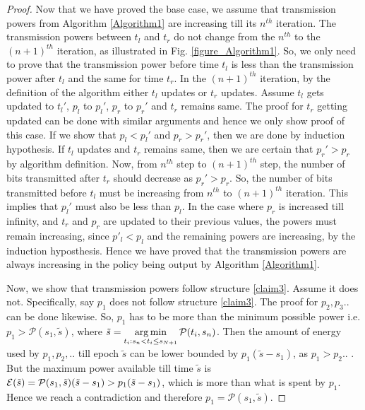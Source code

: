 \begin{proof}
Now that we have proved the base case, we assume that transmission powers from Algorithm \ref{Algorithm1} are increasing till its $n^{th}$ iteration. The transmission powers between $t_l$ and $t_r$ do not change from the $n^{th}$ to the $(n+1)^{th}$ iteration, as illustrated in Fig. \ref{figure_Algorithm1}. So, we only need to prove that the transmission power before time $t_l$ is less than the transmission power after $t_l$ and the same for time $t_r$. In the $(n+1)^{th}$ iteration, by the definition of the algorithm either $t_l$ updates or $t_{r}$ updates. Assume $t_l$ gets updated to $t_{l}'$, $p_l$ to $p_l'$, $p_r$ to $p_r'$ and $t_r$ remains same. The proof for $t_r$ getting updated can be done with similar arguments and hence we only show proof of this case. If we show that $p_l<p_l'$ and $p_r>p_r'$, then we are done by induction hypothesis. If $t_l$ updates and $t_r$ remains same, then we are certain that $p_{r}'>p_r$ by algorithm definition. Now, from $n^{th}$ step to $(n+1)^{th}$ step, the number of bits transmitted after $t_r$ should decrease as $p_{r}'>p_r$. So, the number of bits transmitted before $t_l$ must be increasing from $n^{th}$ to $(n+1)^{th}$ iteration. This implies that $p_l'$ must also be less than $p_l$. In the case where $p_r$ is increased till infinity, and $t_r$ and $p_r$ are updated to their previous values, the powers must remain increasing, since $p'_l <p_l$ and the remaining powers are increasing, by the induction hyposthesis. Hence we have proved that the transmission powers are always increasing in the policy being output by Algorithm \ref{Algorithm1}.

Now, we show that transmission powers follow structure \eqref{claim3}. Assume it does not. Specifically, say $p_1$ does not follow structure \eqref{claim3}. The proof for $p_2,p_3..$ can be done likewise. So, $p_1$ has to be more than the minimum possible power i.e. $p_1>\mathcal{P}(s_1,\tilde{s})$, where $\tilde{s}=\displaystyle\operatorname*{arg\,min}_{t_i: s_n < t_i \le s_{N+1}} \mathcal{P}(t_i,s_n)$. Then the amount of energy used by $p_1,p_2,..$ till epoch $\tilde{s}$ can be lower bounded by $p_1(\tilde{s}-s_1)$, as $p_1>p_2..$ . But the maximum power available till time $\tilde{s}$ is $\mathcal{E}(\tilde{s})=\mathcal{P}(s_1,\tilde{s})(\tilde{s}-s_1)>p_1(\tilde{s}-s_1)$, which is more than what is spent by $p_1$. Hence we reach a contradiction and therefore $p_1=\mathcal{P}(s_1,\tilde{s})$.


\end{proof}
